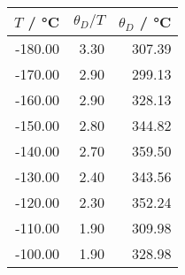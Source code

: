 \begin{tabular}{rrr}
\toprule
$T$ / °C & $\theta_D/T$ & $\theta_D$ / °C \\
\midrule
-180.00 & 3.30 & 307.39 \\
-170.00 & 2.90 & 299.13 \\
-160.00 & 2.90 & 328.13 \\
-150.00 & 2.80 & 344.82 \\
-140.00 & 2.70 & 359.50 \\
-130.00 & 2.40 & 343.56 \\
-120.00 & 2.30 & 352.24 \\
-110.00 & 1.90 & 309.98 \\
-100.00 & 1.90 & 328.98 \\
\bottomrule
\end{tabular}
